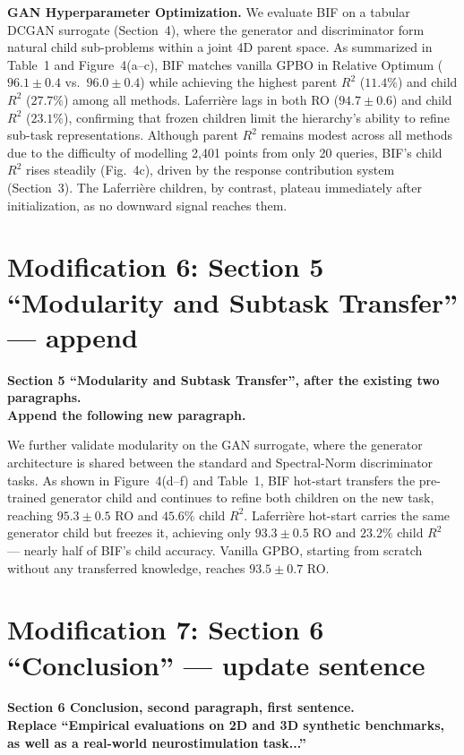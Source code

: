 \documentclass[11pt]{article}
\newcommand{\modloc}[1]{\noindent\colorbox{yellow!30}{\parbox{\dimexpr\textwidth-2\fboxsep}{%
\textbf{#1}}}\medskip}
\begin{document}
\noindent\textbf{GAN Hyperparameter Optimization.}
We evaluate BIF on a tabular DCGAN surrogate (Section~4),
where the generator and discriminator form natural child sub-problems
within a joint 4D parent space.
As summarized in Table~1 and Figure~4(a--c), BIF matches vanilla
GPBO in Relative Optimum ($96.1 \pm 0.4$ vs.\ $96.0 \pm 0.4$) while
achieving the highest parent $R^2$ ($11.4\%$) and child $R^2$ ($27.7\%$)
among all methods.
Laferri\`ere lags in both RO ($94.7 \pm 0.6$) and child $R^2$ ($23.1\%$),
confirming that frozen children limit the hierarchy's ability to
refine sub-task representations.
Although parent $R^2$ remains modest across all methods due to the
difficulty of modelling 2,401 points from only 20 queries,
BIF's child $R^2$ rises steadily (Fig.~4c),
driven by the response contribution system (Section~3).
The Laferri\`ere children, by contrast, plateau immediately after
initialization, as no downward signal reaches them.

\section*{Modification 6: Section 5 ``Modularity and Subtask Transfer'' --- append}
\modloc{Section 5 ``Modularity and Subtask Transfer'', after the existing
two paragraphs.\\
Append the following new paragraph.}

We further validate modularity on the GAN surrogate, where the generator
architecture is shared between the standard and Spectral-Norm
discriminator tasks.
As shown in Figure~4(d--f) and Table~1, BIF hot-start transfers
the pre-trained generator child and continues to refine both children
on the new task, reaching $95.3 \pm 0.5$ RO and $45.6\%$ child $R^2$.
Laferri\`ere hot-start carries the same generator child but freezes it,
achieving only $93.3 \pm 0.5$ RO and $23.2\%$ child $R^2$ ---
nearly half of BIF's child accuracy.
Vanilla GPBO, starting from scratch without any transferred knowledge,
reaches $93.5 \pm 0.7$ RO.

\section*{Modification 7: Section 6 ``Conclusion'' --- update sentence}
\modloc{Section 6 Conclusion, second paragraph, first sentence.\\
Replace ``Empirical evaluations on 2D and 3D synthetic benchmarks, as well
as a real-world neurostimulation task...''}
\end{document}
